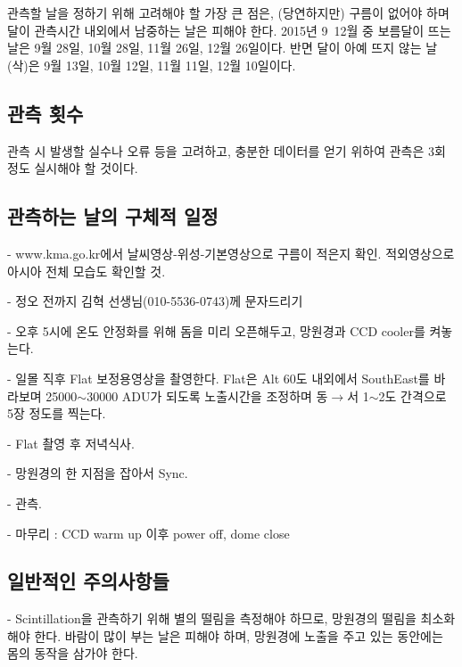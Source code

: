 \documentclass[11pt]{article}
\begin{document}
	관측할 날을 정하기 위해 고려해야 할 가장 큰 점은, (당연하지만) 구름이 없어야 하며 달이 관측시간 내외에서 남중하는 날은 피해야 한다. 2015년 9~12월 중 보름달이 뜨는 날은 9월 28일, 10월 28일, 11월 26일, 12월 26일이다. 반면 달이 아예 뜨지 않는 날(삭)은 9월 13일, 10월 12일, 11월 11일, 12월 10일이다.
	
	\subsection{관측 횟수}
	
	관측 시 발생할 실수나 오류 등을 고려하고, 충분한 데이터를 얻기 위하여 관측은 3회정도 실시해야 할 것이다.
	
	\subsection{관측하는 날의 구체적 일정}
	
	- www.kma.go.kr\cite{kma}에서 날씨영상-위성-기본영상으로 구름이 적은지 확인. 적외영상으로 아시아 전체 모습도 확인할 것.
	
	- 정오 전까지 김혁 선생님(010-5536-0743)께 문자드리기
	
	- 오후 5시에 온도 안정화를 위해 돔을 미리 오픈해두고, 망원경과 CCD cooler를 켜놓는다.
	
	- 일몰 직후 Flat 보정용영상을 촬영한다. Flat은 Alt 60도 내외에서 SouthEast를 바라보며 25000$\sim$30000 ADU가 되도록 노출시간을 조정하며 동$\longrightarrow$서 1$\sim$2도 간격으로 5장 정도를 찍는다.
	
	- Flat 촬영 후 저녁식사.
	
	- 망원경의 한 지점을 잡아서 Sync.
	
	- 관측.
	
	- 마무리 : CCD warm up 이후 power off, dome close
	
	\subsection{일반적인 주의사항들}
	- Scintillation을 관측하기 위해 별의 떨림을 측정해야 하므로, 망원경의 떨림을 최소화해야 한다. 바람이 많이 부는 날은 피해야 하며, 망원경에 노출을 주고 있는 동안에는 몸의 동작을 삼가야 한다.
	
\end{document}
